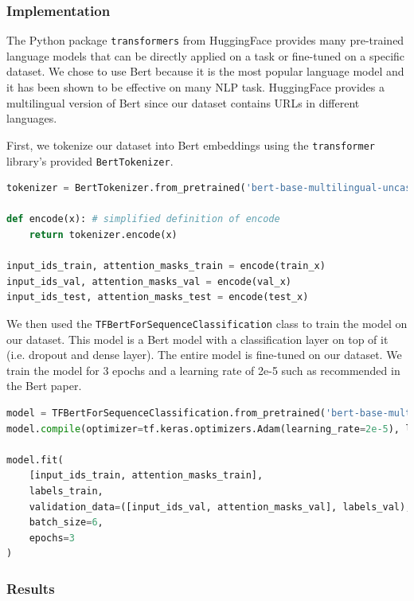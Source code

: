 \documentclass{article}
\begin{document}
    \subsubsection{Implementation}

    The Python package \texttt{transformers} from HuggingFace provides many pre-trained language models that can be directly applied on a task or fine-tuned on a specific dataset. We chose to use Bert because it is the most popular language model and it has been shown to be effective on many NLP task. HuggingFace provides a multilingual version of Bert since our dataset contains URLs in different languages.

    First, we tokenize our dataset into Bert embeddings using the \texttt{transformer} library's provided \texttt{BertTokenizer}.

    \begin{lstlisting}[language=Python, caption=Tokenizing using Bert]
tokenizer = BertTokenizer.from_pretrained('bert-base-multilingual-uncased')

def encode(x): # simplified definition of encode
    return tokenizer.encode(x)

input_ids_train, attention_masks_train = encode(train_x)
input_ids_val, attention_masks_val = encode(val_x)
input_ids_test, attention_masks_test = encode(test_x)
    \end{lstlisting}

    We then used the \texttt{TFBertForSequenceClassification} class to train the model on our dataset. This model is a Bert model with a classification layer on top of it (i.e. dropout and dense layer). The entire model is fine-tuned on our dataset. We train the model for 3 epochs and a learning rate of 2e-5 such as recommended in the Bert paper\cite{devlin2018bert}.

    \begin{lstlisting}[language=Python, caption=Fine tuning Bert]
model = TFBertForSequenceClassification.from_pretrained('bert-base-multilingual-uncased')
model.compile(optimizer=tf.keras.optimizers.Adam(learning_rate=2e-5), loss=tf.keras.losses.SparseCategoricalCrossentropy(from_logits=True), metrics="accuracy")

model.fit(
    [input_ids_train, attention_masks_train],
    labels_train,
    validation_data=([input_ids_val, attention_masks_val], labels_val),
    batch_size=6,
    epochs=3
)
    \end{lstlisting}

    \subsubsection{Results}
\end{document}
